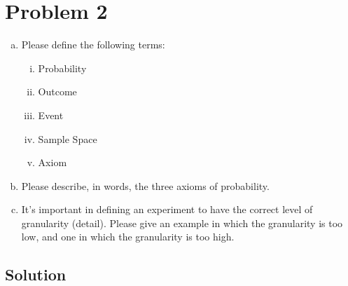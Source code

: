 \section{Problem 2}
\begin{enumerate}[a.]
	\item Please define the following terms:
	\begin{enumerate}[(i)]
		\item Probability
		\item Outcome
		\item Event
		\item Sample Space
		\item Axiom
	\end{enumerate}
	\item Please describe, in words, the three axioms of probability.
	\item  It's important in defining an experiment to have the correct level of granularity (detail). Please give an example in which the granularity is too low, and one in which the granularity is too high.
\end{enumerate}

\subsection{Solution}